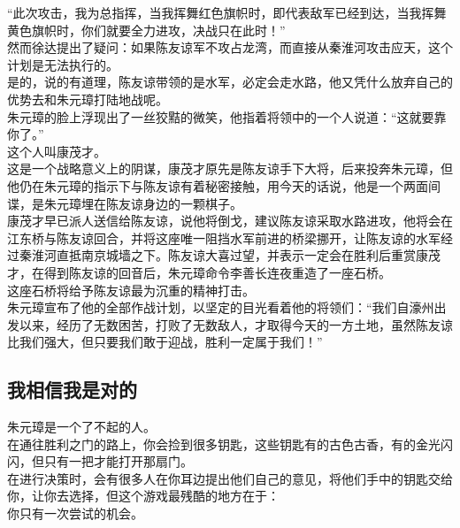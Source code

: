 \begin{multicols}{\theparacolNo}
“此次攻击，我为总指挥，当我挥舞红色旗帜时，即代表敌军已经到达，当我挥舞黄色旗帜时，你们就要全力进攻，决战只在此时！”\\

然而徐达提出了疑问：如果陈友谅军不攻占龙湾，而直接从秦淮河攻击应天，这个计划是无法执行的。\\

是的，说的有道理，陈友谅带领的是水军，必定会走水路，他又凭什么放弃自己的优势去和朱元璋打陆地战呢。\\

朱元璋的脸上浮现出了一丝狡黠的微笑，他指着将领中的一个人说道：“这就要靠你了。”\\

这个人叫康茂才。\\

这是一个战略意义上的阴谋，康茂才原先是陈友谅手下大将，后来投奔朱元璋，但他仍在朱元璋的指示下与陈友谅有着秘密接触，用今天的话说，他是一个两面间谍，是朱元璋埋在陈友谅身边的一颗棋子。\\

康茂才早已派人送信给陈友谅，说他将倒戈，建议陈友谅采取水路进攻，他将会在江东桥与陈友谅回合，并将这座唯一阻挡水军前进的桥梁挪开，让陈友谅的水军经过秦淮河直抵南京城墙之下。陈友谅大喜过望，并表示一定会在胜利后重赏康茂才，在得到陈友谅的回音后，朱元璋命令李善长连夜重造了一座石桥。\\

这座石桥将给予陈友谅最为沉重的精神打击。\\

朱元璋宣布了他的全部作战计划，以坚定的目光看着他的将领们：“我们自濠州出发以来，经历了无数困苦，打败了无数敌人，才取得今天的一方土地，虽然陈友谅比我们强大，但只要我们敢于迎战，胜利一定属于我们！”\\

\subsection{我相信我是对的}
朱元璋是一个了不起的人。\\

在通往胜利之门的路上，你会捡到很多钥匙，这些钥匙有的古色古香，有的金光闪闪，但只有一把才能打开那扇门。\\

在进行决策时，会有很多人在你耳边提出他们自己的意见，将他们手中的钥匙交给你，让你去选择，但这个游戏最残酷的地方在于：\\

你只有一次尝试的机会。\\


\end{multicols}
